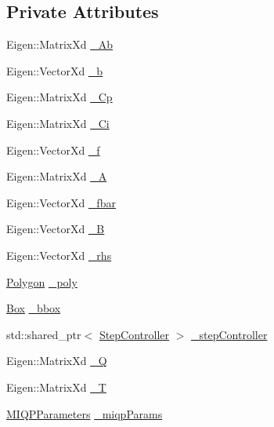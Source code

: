 \subsection*{\-Private \-Attributes}
\begin{DoxyCompactItemize}
\item 
\-Eigen\-::\-Matrix\-Xd \hyperlink{classBaseOfSupport_a42d531cd89c34cf8821c5cdeff321bc1}{\-\_\-\-Ab}
\item 
\-Eigen\-::\-Vector\-Xd \hyperlink{classBaseOfSupport_a9a77c3e98a73065f60b99e888c50fcc7}{\-\_\-b}
\item 
\-Eigen\-::\-Matrix\-Xd \hyperlink{classBaseOfSupport_a0ff0fd44966f86d5a62e4d38c3cfea60}{\-\_\-\-Cp}
\item 
\-Eigen\-::\-Matrix\-Xd \hyperlink{classBaseOfSupport_a0a7a51d0d278841633e4b291df96065d}{\-\_\-\-Ci}
\item 
\-Eigen\-::\-Vector\-Xd \hyperlink{classBaseOfSupport_aa2d0af7272d153ead5e088ff67c981e8}{\-\_\-f}
\item 
\-Eigen\-::\-Matrix\-Xd \hyperlink{classBaseOfSupport_a54a35d087a8dfaee9a27d025d46f706d}{\-\_\-\-A}
\item 
\-Eigen\-::\-Vector\-Xd \hyperlink{classBaseOfSupport_aa578314a7473867f545b95883beb6c6b}{\-\_\-fbar}
\item 
\-Eigen\-::\-Vector\-Xd \hyperlink{classBaseOfSupport_adfa70199064a50d9d7aea9a6d4b13246}{\-\_\-\-B}
\item 
\-Eigen\-::\-Vector\-Xd \hyperlink{classBaseOfSupport_a274325bb39f10aac06153b82a2541c3b}{\-\_\-rhs}
\item 
\hyperlink{BaseOfSupport_8h_a3b0bf53b9d321e300a59729ebe10e02c}{\-Polygon} \hyperlink{classBaseOfSupport_a7e9b4ef515f90e2a7012871e7287bf5e}{\-\_\-poly}
\item 
\hyperlink{BaseOfSupport_8h_ac470b50f15f04405e67b9031615134f0}{\-Box} \hyperlink{classBaseOfSupport_a8af13ff0086dc08252d49f69b1752033}{\-\_\-bbox}
\item 
std\-::shared\-\_\-ptr$<$ \hyperlink{classStepController}{\-Step\-Controller} $>$ \hyperlink{classBaseOfSupport_a023d28c6900f0e97d9de42ca2c5d94a5}{\-\_\-step\-Controller}
\item 
\-Eigen\-::\-Matrix\-Xd \hyperlink{classBaseOfSupport_a22efc7f81862ffd1268b862ddb9d59ff}{\-\_\-\-Q}
\item 
\-Eigen\-::\-Matrix\-Xd \hyperlink{classBaseOfSupport_a52f07f15e1667eb7876e614dcd817ef1}{\-\_\-\-T}
\item 
\hyperlink{structMIQPParameters}{\-M\-I\-Q\-P\-Parameters} \hyperlink{classBaseOfSupport_a82f86511c236d038f1670dd515e53a8f}{\-\_\-miqp\-Params}
\end{DoxyCompactItemize}


